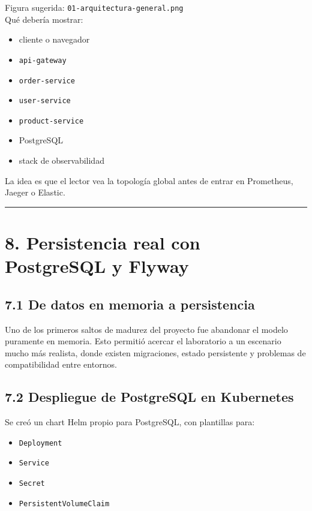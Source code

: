 \documentclass[
a4paper,
12pt]{report}
\providecommand{\tightlist}{%
  \setlength{\itemsep}{0pt}\setlength{\parskip}{0pt}}
\begin{document}
Figura sugerida: \texttt{01-arquitectura-general.png}\\
Qué debería mostrar:

\begin{itemize}
\tightlist
\item
  cliente o navegador
\item
  \texttt{api-gateway}
\item
  \texttt{order-service}
\item
  \texttt{user-service}
\item
  \texttt{product-service}
\item
  PostgreSQL
\item
  stack de observabilidad
\end{itemize}

La idea es que el lector vea la topología global antes de entrar en
Prometheus, Jaeger o Elastic.

\begin{center}\rule{0.5\linewidth}{0.5pt}\end{center}

\chapter{8. Persistencia real con PostgreSQL y
Flyway}\label{persistencia-real-con-postgresql-y-flyway}

\section{7.1 De datos en memoria a
persistencia}\label{de-datos-en-memoria-a-persistencia}

Uno de los primeros saltos de madurez del proyecto fue abandonar el
modelo puramente en memoria. Esto permitió acercar el laboratorio a un
escenario mucho más realista, donde existen migraciones, estado
persistente y problemas de compatibilidad entre entornos.

\section{7.2 Despliegue de PostgreSQL en
Kubernetes}\label{despliegue-de-postgresql-en-kubernetes}

Se creó un chart Helm propio para PostgreSQL, con plantillas para:

\begin{itemize}
\tightlist
\item
  \texttt{Deployment}
\item
  \texttt{Service}
\item
  \texttt{Secret}
\item
  \texttt{PersistentVolumeClaim}
\end{itemize}
\end{document}
